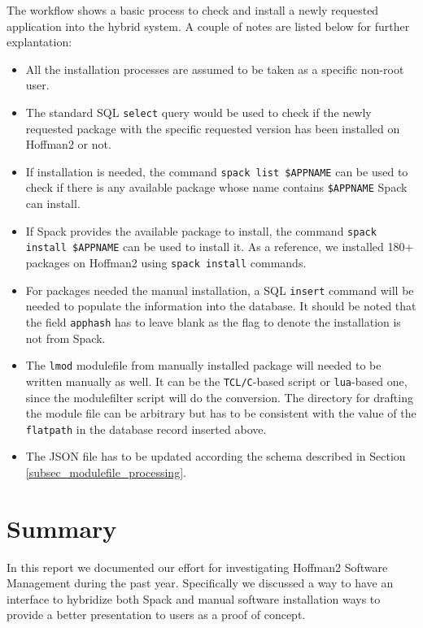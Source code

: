 \documentclass[conference]{IEEEtran}
\begin{document}
The workflow shows a basic process to check and install a newly requested application into the hybrid system. A couple of notes are listed below for further explantation:

\begin{itemize}
    \item All the installation processes are assumed to be taken as a specific non-root user.
    \item The standard SQL \verb|select| query would be used to check if the newly requested package with the specific requested version has been installed on Hoffman2 or not.
    \item If installation is needed, the command \verb|spack list $APPNAME|\cite{spack:20} can be used to check if there is any available package whose name contains \verb|$APPNAME| Spack can install. 
    \item If Spack provides the available package to install, the command \verb|spack install $APPNAME|\cite{spack:20} can be used to install it. As a reference, we installed 180+ packages on Hoffman2 using \verb|spack install| commands. 
    \item For packages needed the manual installation, a SQL \verb|insert| command will be needed to populate the information into the database. It should be noted that the field \verb|apphash| has to leave blank as the flag to denote the installation is not from Spack.
    \item The \verb|lmod| modulefile from manually installed package will needed to be written manually as well. It can be the \verb|TCL/C|-based script or \verb|lua|-based one, since the modulefilter script will do the conversion. The directory for drafting the module file can be arbitrary but has to be consistent with the value of the \verb|flatpath| in the database record inserted above.
    \item The JSON file has to be updated according the schema described in Section \ref{subsec_modulefile_processing}. 
\end{itemize}


\section{Summary} \label{sec_summary}

In this report we documented our effort for investigating Hoffman2 Software Management during the past year. Specifically we discussed a way to have an interface to hybridize both Spack and manual software installation ways to provide a better presentation to users as a proof of concept.
\end{document}
